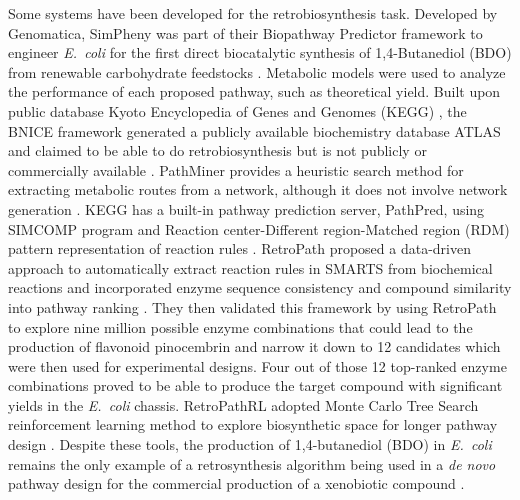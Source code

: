 \documentclass{article}
\begin{document}
Some systems have been developed for the retrobiosynthesis task. 
Developed by Genomatica, SimPheny was part of their Biopathway Predictor framework to engineer \textit{E.~coli} for the first direct biocatalytic synthesis of 1,4-Butanediol (BDO) from renewable carbohydrate feedstocks \citep{yim2011metabolic}. Metabolic models were used to analyze the performance of each proposed pathway, such as theoretical yield. 
Built upon public database Kyoto Encyclopedia of Genes and Genomes (KEGG) \citep{kanehisa1996toward, kanehisa1997database, kanehisa2000kegg, kanehisa2012kegg, kanehisa2016kegg}, the BNICE framework generated a publicly available biochemistry database ATLAS and claimed to be able to do retrobiosynthesis but is not publicly or commercially available \citep{hadadi2016atlas, hafner2020updated, hatzimanikatis2005exploring, finley2009computational, soh2010dreams, finley2010silico}.   
PathMiner provides a heuristic search method for extracting metabolic routes from a network, although it does not involve network generation \citep{mcshan2003pathminer}.
KEGG has a built-in pathway prediction server, PathPred, using SIMCOMP program and Reaction center-Different region-Matched region (RDM) pattern representation of reaction rules \citep{moriya2010pathpred, hattori2003development}. 
RetroPath proposed a data-driven approach to automatically extract reaction rules in SMARTS from biochemical reactions and incorporated enzyme sequence consistency and compound similarity into pathway ranking \citep{delepine2018retropath2}. 
They then validated this framework by using RetroPath to explore nine million possible enzyme combinations that could lead to the production of flavonoid pinocembrin and narrow it down to 12 candidates which were then used for experimental designs. 
Four out of those 12 top-ranked enzyme combinations proved to be able to produce the target compound with significant yields in the \textit{E.~coli} chassis.
RetroPathRL adopted Monte Carlo Tree Search reinforcement learning method to explore biosynthetic space for longer pathway design \citep{koch2019reinforcement}.
Despite these tools, the production of 1,4-butanediol (BDO) in \textit{E.~coli} remains the only example of a retrosynthesis algorithm being used in a \textit{de novo} pathway design for the commercial production of a xenobiotic compound \citep{lin2019retrosynthetic}. 
\end{document}
